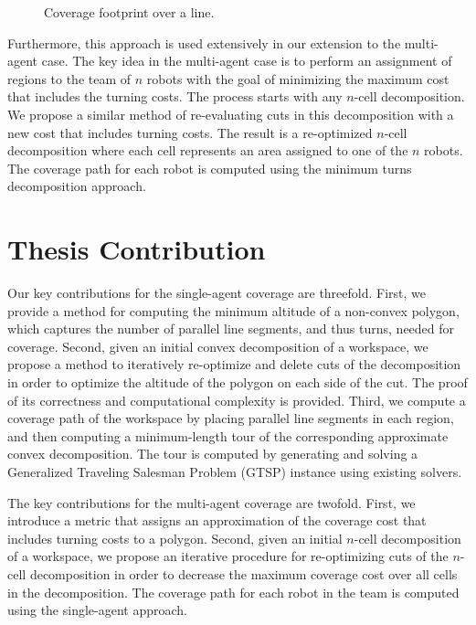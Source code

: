 \documentclass[../main.tex]{subfiles}
\begin{document}
\begin{figure}
	\centering
	
	\caption{Coverage footprint over a line.}
	\label{fig:line_footprint}
\end{figure}

Furthermore, this approach is used extensively in our extension to the multi-agent case. The key idea in the multi-agent case is to perform an assignment of regions to the team of $n$ robots with the goal of minimizing the maximum cost that includes the turning costs. The process starts with any $n$-cell decomposition. We propose a similar method of re-evaluating cuts in this decomposition with a new cost that includes turning costs. The result is a re-optimized $n$-cell decomposition where each cell represents an area assigned to one of the $n$ robots. The coverage path for each robot is computed using the minimum turns decomposition approach.


\section{Thesis Contribution}
\label{section:thesis_contribution}

Our key contributions for the single-agent coverage are threefold. First, we provide a method for computing the minimum altitude of a non-convex polygon, which captures the number of parallel line segments, and thus turns, needed for coverage. Second, given an initial convex decomposition of a workspace, we propose a method to iteratively re-optimize and delete cuts of the decomposition in order to optimize the altitude of the polygon on each side of the cut. The proof of its correctness and computational complexity is provided. Third, we compute a coverage path of the workspace by placing parallel line segments in each region, and then computing a minimum-length tour of the corresponding approximate convex decomposition. The tour is computed by generating and solving a Generalized Traveling Salesman Problem (GTSP) instance using existing solvers.

The key contributions for the multi-agent coverage are twofold. First, we introduce a metric that assigns an approximation of the coverage cost that includes turning costs to a polygon. Second, given an initial $n$-cell decomposition of a workspace, we propose an iterative procedure for re-optimizing cuts of the $n$-cell decomposition in order to decrease the maximum coverage cost over all cells in the decomposition. The coverage path for each robot in the team is computed using the single-agent approach.
\end{document}

